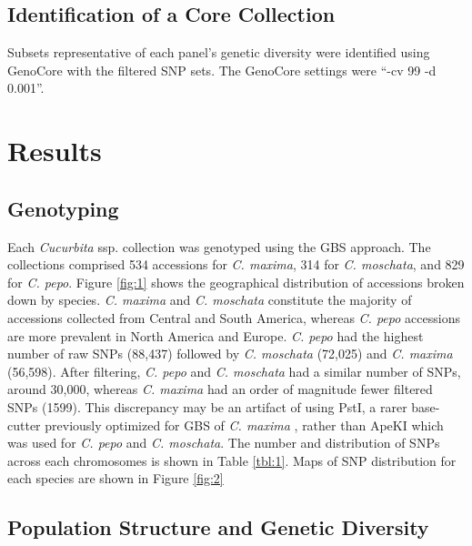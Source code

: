 \documentclass[utf8]{FrontiersinHarvard} %
\begin{document}
\subsection{Identification of a Core Collection}
Subsets representative of each panel’s genetic diversity were identified using GenoCore \citep{Jeong2017} with the filtered SNP sets. The GenoCore settings were “-cv 99 -d 0.001”.


\section{Results}

\subsection{Genotyping}
Each \textit{Cucurbita} ssp. collection was genotyped using the GBS approach. The collections comprised 534 accessions for \textit{C. maxima}, 314 for \textit{C. moschata}, and 829 for \textit{C. pepo}. Figure \ref{fig:1} shows the geographical distribution of accessions broken down by species. \textit{C. maxima} and \textit{C. moschata} constitute the majority of accessions collected from Central and South America, whereas \textit{C. pepo} accessions are more prevalent in North America and Europe. \textit{C. pepo} had the highest number of raw SNPs (88,437) followed by \textit{C. moschata} (72,025) and \textit{C. maxima} (56,598). After filtering, \textit{C. pepo} and \textit{C. moschata} had a similar number of SNPs, around 30,000, whereas \textit{C. maxima} had an order of magnitude fewer filtered SNPs (1599). This discrepancy may be an artifact of using PstI, a rarer base-cutter previously optimized for GBS of \textit{C. maxima} \citep{Zhang2015} , rather than ApeKI which was used for \textit{C. pepo} and \textit{C. moschata}. The number and distribution of SNPs across each chromosomes is shown in Table \ref{tbl:1}. Maps of SNP distribution for each species are shown in Figure \ref{fig:2}

\subsection{Population Structure and Genetic Diversity}
\end{document}
